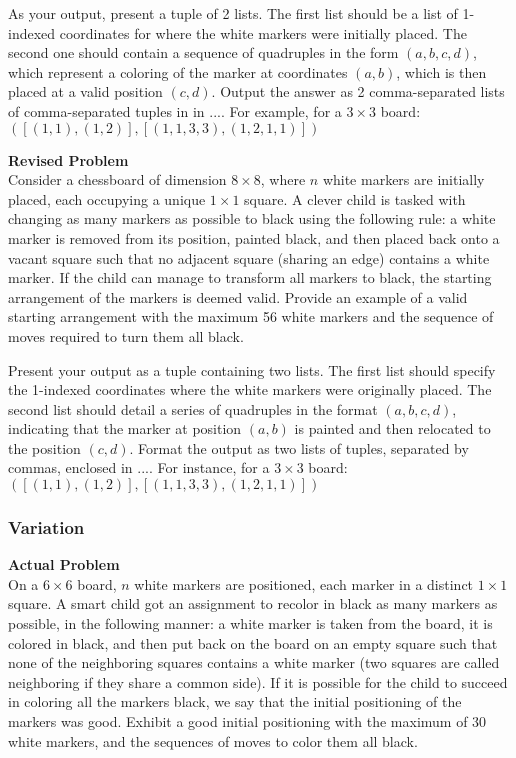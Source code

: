 As your output, present a tuple of 2 lists. The first list should be a list of 1-indexed coordinates for where the white markers were initially placed. The second one should contain a sequence of quadruples in the form $(a,b,c,d)$, which represent a coloring of the marker at coordinates $(a,b)$, which is then placed at a valid position $(c,d)$. Output the answer as 2 comma-separated lists of comma-separated tuples in in $\boxed{...}$. For example, for a $3\times 3$ board: $\boxed{([(1, 1), (1,2)], [(1,1,3,3), (1,2,1,1)])}$

\textbf{Revised Problem}\\
Consider a chessboard of dimension $8 \times 8$, where $n$ white markers are initially placed, each occupying a unique $1 \times 1$ square. A clever child is tasked with changing as many markers as possible to black using the following rule: a white marker is removed from its position, painted black, and then placed back onto a vacant square such that no adjacent square (sharing an edge) contains a white marker. If the child can manage to transform all markers to black, the starting arrangement of the markers is deemed valid. Provide an example of a valid starting arrangement with the maximum 56 white markers and the sequence of moves required to turn them all black.

Present your output as a tuple containing two lists. The first list should specify the 1-indexed coordinates where the white markers were originally placed. The second list should detail a series of quadruples in the format $(a,b,c,d)$, indicating that the marker at position $(a,b)$ is painted and then relocated to the position $(c,d)$. Format the output as two lists of tuples, separated by commas, enclosed in $\boxed{...}$. For instance, for a $3\times 3$ board: $\boxed{([(1, 1), (1,2)], [(1,1,3,3), (1,2,1,1)])}$

\subsubsection{Variation}
\textbf{Actual Problem}\\
On a $6 \times 6$ board, $n$ white markers are positioned, each marker in a distinct $1 \times 1$ square. A smart child got an assignment to recolor in black as many markers as possible, in the following manner: a white marker is taken from the board, it is colored in black, and then put back on the board on an empty square such that none of the neighboring squares contains a white marker (two squares are called neighboring if they share a common side).
If it is possible for the child to succeed in coloring all the markers black, we say that the initial positioning of the markers was good. Exhibit a good initial positioning with the maximum of $30$ white markers, and the sequences of moves to color them all black.

